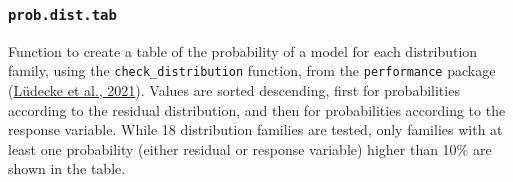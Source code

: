 \documentclass[
  bookmarksnumbered]{article}
\begin{document}
\hypertarget{prob.dist.tab}{%
\subsubsection{\texorpdfstring{\texttt{prob.dist.tab}}{prob.dist.tab}}\label{prob.dist.tab}}

Function to create a table of the probability of a model for each distribution family, using the \texttt{check\_distribution} function, from the \texttt{performance} package (\protect\hyperlink{ref-ludecke2021}{Lüdecke et al., 2021}). Values are sorted descending, first for probabilities according to the residual distribution, and then for probabilities according to the response variable. While 18 distribution families are tested, only families with at least one probability (either residual or response variable) higher than 10\% are shown in the table.
\end{document}
